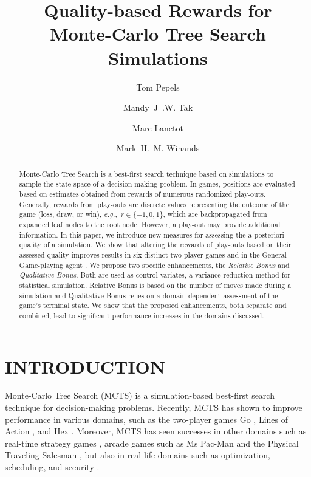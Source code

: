 \documentclass{ecai2014}
\newcommand{\eg}{{\it e.g.,}~}
\begin{document}
\title{Quality-based Rewards for \\ Monte-Carlo Tree Search Simulations}

\author{Tom Pepels \and Mandy~J~.W. Tak \and Marc Lanctot \and Mark~H.~M. Winands }

\maketitle


\begin{abstract}
Monte-Carlo Tree Search is a best-first search technique based on simulations to sample the state space of a decision-making problem. In games, positions are evaluated based on estimates obtained from rewards of numerous randomized play-outs. Generally, rewards from play-outs are discrete values representing the outcome of the game (loss, draw, or win), \eg $r \in \{-1, 0, 1\}$, which are backpropagated from expanded leaf nodes to the root node. However, a play-out may provide additional information. In this paper, we introduce new measures for assessing the a posteriori quality of a simulation. We show that altering the rewards of play-outs based on their assessed quality improves results in six distinct two-player games and in the General Game-playing agent {}. We propose two specific enhancements, the \emph{Relative Bonus} and \emph{Qualitative Bonus}. Both are used as control variates, a variance reduction method for statistical simulation. Relative Bonus is based on the number of moves made during a simulation and Qualitative Bonus relies on a domain-dependent assessment of the game's terminal state. We show that the proposed enhancements, both separate and combined, lead to significant performance increases in the domains discussed.
\end{abstract}

\section{INTRODUCTION}
\label{sec:intro}
Monte-Carlo Tree Search (MCTS) \cite{coulom2007efficient,kocsis2006bandit} is a simulation-based best-first search technique for decision-making problems. Recently, MCTS has shown to improve performance in various domains, such as the two-player games Go \cite{lee2010current}, Lines of Action \cite{Winands2010b}, and Hex \cite{arneson2010monte}. Moreover, MCTS has seen successes in other domains such as real-time strategy games \cite{browne2012survey}, arcade games such as Ms Pac-Man \cite{enhancementspacmancig12} and the Physical Traveling Salesman \cite{powleytsp}, but also in real-life domains such as optimization, scheduling, and security \cite{browne2012survey}.
\end{document}
